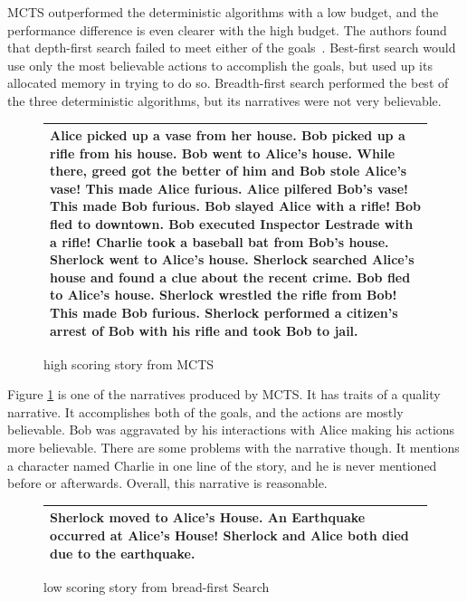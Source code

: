 \documentclass{sig-alternate}
\begin{document}
MCTS outperformed the deterministic algorithms with a low budget, and the performance difference is even clearer with the high budget. The authors found that depth-first search failed to meet either of the goals~\cite{Narrative}. Best-first search would use only the most believable actions to accomplish the goals, but used up its allocated memory in trying to do so. Breadth-first search performed the best of the three deterministic algorithms, but its narratives were not very believable.

\begin{figure}[h]
\begin{tabular}{|p{8cm}|}
\hline
Alice picked up a vase from her house. Bob picked up a rifle from his house. Bob went to Alice's house. While there, greed got the better of him and Bob stole Alice's vase! This made Alice furious. Alice pilfered Bob's vase! This made Bob furious. Bob slayed Alice with a rifle! Bob fled to downtown. Bob executed Inspector Lestrade with a rifle! Charlie took a baseball bat from Bob's house. Sherlock went to Alice's house. Sherlock searched Alice's house and found a clue about the recent crime. Bob fled to Alice's house. Sherlock wrestled the rifle from Bob! This made Bob furious. Sherlock performed a citizen's arrest of Bob with his rifle and took Bob to jail. \\ \hline
\end{tabular}
\centering
\caption{high scoring story from MCTS}
\label{fig:GoodStory}
\end{figure}

Figure \ref{fig:GoodStory} is one of the narratives produced by MCTS. It has traits of a quality narrative. It accomplishes both of the goals, and the actions are mostly believable. Bob was aggravated by his interactions with Alice making his actions more believable. There are some problems with the narrative though. It mentions a character named Charlie in one line of the story, and he is never mentioned before or afterwards. Overall, this narrative is reasonable.

\begin{figure}[h]
\begin{tabular}{|p{8cm}|}
\hline
Sherlock moved to Alice's House. An Earthquake occurred at Alice's House! Sherlock and Alice both died due to the earthquake. \\ \hline
\end{tabular}
\centering
\caption{low scoring story from bread-first Search}
\label{fig:BadStory}
\end{figure}
\end{document}

